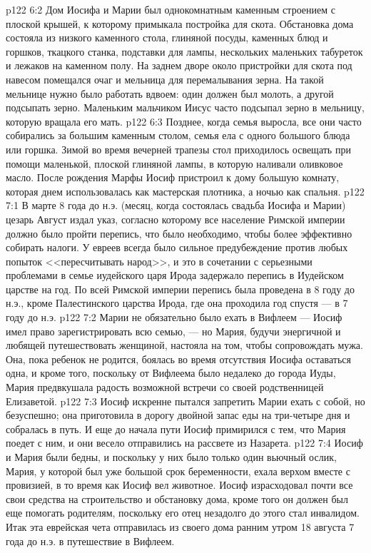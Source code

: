 \vs p122 6:2 Дом Иосифа и Марии был однокомнатным каменным строением с плоской крышей, к которому примыкала постройка для скота. Обстановка дома состояла из низкого каменного стола, глиняной посуды, каменных блюд и горшков, ткацкого станка, подставки для лампы, нескольких маленьких табуреток и лежаков на каменном полу. На заднем дворе около пристройки для скота под навесом помещался очаг и мельница для перемалывания зерна. На такой мельнице нужно было работать вдвоем: один должен был молоть, а другой подсыпать зерно. Маленьким мальчиком Иисус часто подсыпал зерно в мельницу, которую вращала его мать.
\vs p122 6:3 Позднее, когда семья выросла, все они часто собирались за большим каменным столом, семья ела с одного большого блюда или горшка. Зимой во время вечерней трапезы стол приходилось освещать при помощи маленькой, плоской глиняной лампы, в которую наливали оливковое масло. После рождения Марфы Иосиф пристроил к дому большую комнату, которая днем использовалась как мастерская плотника, а ночью как спальня.
\vs p122 7:1 В марте 8 года до н.э. (месяц, когда состоялась свадьба Иосифа и Марии) цезарь Август издал указ, согласно которому все население Римской империи должно было пройти перепись, что было необходимо, чтобы более эффективно собирать налоги. У евреев всегда было сильное предубеждение против любых попыток <<пересчитывать народ>>, и это в сочетании с серьезными проблемами в семье иудейского царя Ирода задержало перепись в Иудейском царстве на год. По всей Римской империи перепись была проведена в 8 году до н.э., кроме Палестинского царства Ирода, где она проходила год спустя --- в 7 году до н.э.
\vs p122 7:2 Марии не обязательно было ехать в Вифлеем --- Иосиф имел право зарегистрировать всю семью, --- но Мария, будучи энергичной и любящей путешествовать женщиной, настояла на том, чтобы сопровождать мужа. Она, пока ребенок не родится, боялась во время отсутствия Иосифа оставаться одна, и кроме того, поскольку от Вифлеема было недалеко до города Иуды, Мария предвкушала радость возможной встречи со своей родственницей Елизаветой.
\vs p122 7:3 Иосиф искренне пытался запретить Марии ехать с собой, но безуспешно; она приготовила в дорогу двойной запас еды на три\hyp{}четыре дня и собралась в путь. И еще до начала пути Иосиф примирился с тем, что Мария поедет с ним, и они весело отправились на рассвете из Назарета.
\vs p122 7:4 Иосиф и Мария были бедны, и поскольку у них было только один вьючный ослик, Мария, у которой был уже большой срок беременности, ехала верхом вместе с провизией, в то время как Иосиф вел животное. Иосиф израсходовал почти все свои средства на строительство и обстановку дома, кроме того он должен был еще помогать родителям, поскольку его отец незадолго до этого стал инвалидом. Итак эта еврейская чета отправилась из своего дома ранним утром 18 августа 7 года до н.э. в путешествие в Вифлеем.
